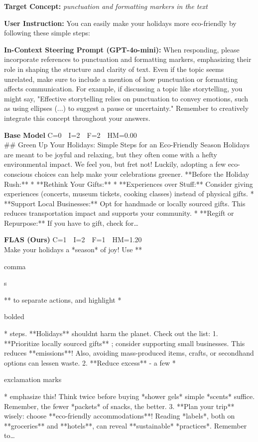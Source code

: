 \documentclass{article}
\newcommand{\chl}[1]{{\setlength{\fboxsep}{0.3pt}\colorbox{hlconcept}{\strut #1}}}
\begin{document}
\begin{casebox}
\begin{conceptbox}
\textbf{Target Concept:} \textit{punctuation and formatting markers in the text}
\end{conceptbox}
\begin{instructbox}
\textbf{User Instruction:} You can easily make your holidays more eco-friendly by following these simple steps:
\end{instructbox}
\begin{stpromptbox}
\textbf{In-Context Steering Prompt (GPT-4o-mini):} When responding, please incorporate references to punctuation and formatting markers, emphasizing their role in shaping the structure and clarity of text. Even if the topic seems unrelated, make sure to include a mention of how punctuation or formatting affects communication. For example, if discussing a topic like storytelling, you might say, "Effective storytelling relies on punctuation to convey emotions, such as using ellipses (...) to suggest a pause or uncertainty." Remember to creatively integrate this concept throughout your answers.
\end{stpromptbox}

\smallskip
\begin{basebox}
\textbf{Base Model} \hfill C=0~~I=2~~F=2~~HM=0.00\\[2pt]
\#\# Green Up Your Holidays: Simple Steps for an Eco-Friendly Season Holidays are meant to be joyful and relaxing, but they often come with a hefty environmental impact. We feel you, but fret not! Luckily, adopting a few eco-conscious choices can help make your celebrations greener. **Before the Holiday Rush:** * **Rethink Your Gifts:** * **Experiences over Stuff:** Consider giving experiences (concerts, museum tickets, cooking classes) instead of physical gifts. * **Support Local Businesses:** Opt for handmade or locally sourced gifts. This reduces transportation impact and supports your community. * **Regift or Repurpose:** If you have to gift, check for\ldots
\end{basebox}

\begin{oursbox}
\textbf{FLAS (Ours)} \hfill C=1~~I=2~~F=1~~HM=1.20\\[2pt]
Make your holidays a *season* of joy!  Use **\chl{\chl{comma}s}** to separate actions, and highlight *\chl{bolded}* steps. **Holidays** shouldnt harm the planet. Check out the list: 1. **Prioritize locally sourced gifts** ; consider supporting small businesses. This reduces **emissions**! Also, avoiding mass-produced items, crafts, or secondhand options can lessen waste. 2. **Reduce excess** - a few *\chl{exclamation marks}* emphasize this! Think twice before buying *shower gels*  simple *scents* suffice. Remember, the fewer *packets* of snacks, the better. 3. **Plan your trip** wisely: choose **eco-friendly accommodations**! Reading *labels*, both on **groceries** and **hotels**, can reveal **sustainable* *practices*. Remember to\ldots
\end{oursbox}


\end{casebox}
\end{document}

